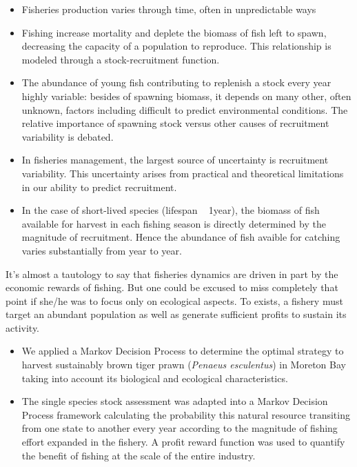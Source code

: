 \documentclass[11pt]{article}
\begin{document}
\begin{itemize}
\item Fisheries production varies through time, often in unpredictable ways
\item Fishing increase mortality and deplete the biomass of fish left to spawn, decreasing the capacity of a population to reproduce. This relationship is modeled through a stock-recruitment function.
\item The abundance of young fish contributing to replenish a stock every year highly variable: besides of spawning biomass, it depends on many other, often unknown, factors including difficult to predict environmental conditions. The relative importance of spawning stock versus other causes of recruitment variability is debated.
\item In fisheries management, the largest source of uncertainty is recruitment variability. This uncertainty arises from practical and theoretical limitations in our ability to predict recruitment.
\item In the case of short-lived species (lifespan ~ 1year), the biomass of fish available for harvest in each fishing season is directly determined by the magnitude of recruitment. Hence the abundance of fish avaible for catching varies substantially from year to year.
  
\end{itemize}

It's almost a tautology to say that fisheries dynamics are driven in part by the economic rewards of fishing. But one could be excused to miss completely that point if she/he was to focus only on ecological aspects. To exists, a fishery must target an abundant population as well as generate sufficient profits to sustain its activity.\\


\begin{itemize}
\item We applied a Markov Decision Process to determine the optimal strategy to harvest sustainably brown tiger prawn ({\it Penaeus esculentus}) in Moreton Bay taking into account its biological and ecological characteristics.
\item The single species stock assessment was adapted into a Markov Decision Process framework calculating the probability this natural resource transiting from one state to another every year according to the magnitude of fishing effort expanded in the fishery. A profit reward function was used to quantify the benefit of fishing at the scale of the entire industry. 
\end{itemize}
\end{document}
